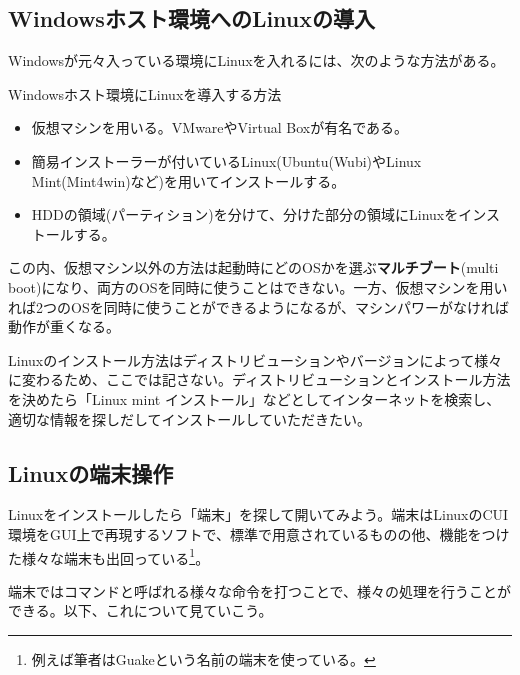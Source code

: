 \subsection{Windowsホスト環境へのLinuxの導入}
Windowsが元々入っている環境にLinuxを入れるには、次のような方法がある。
\begin{itembox}[l]{Windowsホスト環境にLinuxを導入する方法}
\begin{itemize}
\item 仮想マシンを用いる。VMwareやVirtual Boxが有名である。
\item 簡易インストーラーが付いているLinux(Ubuntu(Wubi)やLinux Mint(Mint4win)など)を用いてインストールする。
\item HDDの領域(パーティション)を分けて、分けた部分の領域にLinuxをインストールする。
\end{itemize}
\end{itembox}

この内、仮想マシン以外の方法は起動時にどのOSかを選ぶ\textbf{マルチブート}(multi boot)になり、両方のOSを同時に使うことはできない。一方、仮想マシンを用いれば2つのOSを同時に使うことができるようになるが、マシンパワーがなければ動作が重くなる。

Linuxのインストール方法はディストリビューションやバージョンによって様々に変わるため、ここでは記さない。ディストリビューションとインストール方法を決めたら「Linux mint インストール」などとしてインターネットを検索し、適切な情報を探しだしてインストールしていただきたい。

\subsection{Linuxの端末操作}
Linuxをインストールしたら「端末」を探して開いてみよう。端末はLinuxのCUI環境をGUI上で再現するソフトで、標準で用意されているものの他、機能をつけた様々な端末も出回っている\footnote{例えば筆者はGuakeという名前の端末を使っている。}。

端末ではコマンドと呼ばれる様々な命令を打つことで、様々の処理を行うことができる。以下、これについて見ていこう。

